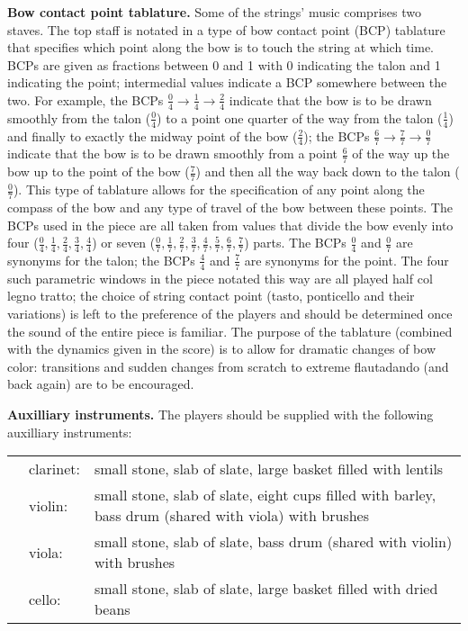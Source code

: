 \documentclass[10pt]{article}
\begin{document}
\begin{textblock}{23}
\textbf{Bow contact point tablature.} Some of the strings' music comprises two
staves. The top staff is notated in a type of bow contact point (BCP) tablature
that specifies which point along the bow is to touch the string at which time.
BCPs are given as fractions between 0 and 1 with 0 indicating the talon and 1
indicating the point; intermedial values indicate a BCP somewhere between the
two. For example, the BCPs $\frac{0}{4} \longrightarrow \frac{1}{4}
\longrightarrow \frac{2}{4}$ indicate that the bow is to be drawn smoothly from
the talon ($\frac{0}{4}$) to a point one quarter of the way from the talon
($\frac{1}{4}$) and finally to exactly the midway point of the bow
($\frac{2}{4}$); the BCPs $\frac{6}{7} \longrightarrow \frac{7}{7}
\longrightarrow \frac{0}{7}$ indicate that the bow is to be drawn smoothly from
a point $\frac{6}{7}$ of the way up the bow up to the point of the bow
($\frac{7}{7}$) and then all the way back down to the talon ($\frac{0}{7}$).
This type of tablature allows for the specification of any point along the
compass of the bow and any type of travel of the bow between these points. The
BCPs used in the piece are all taken from values that divide the bow evenly
into four ($\frac{0}{4}, \frac{1}{4}, \frac{2}{4}, \frac{3}{4}, \frac{4}{4}$)
or seven ($\frac{0}{7}, \frac{1}{7}, \frac{2}{7}, \frac{3}{7}, \frac{4}{7},
\frac{5}{7}, \frac{6}{7}, \frac{7}{7}$) parts. The BCPs $\frac{0}{4}$ and
$\frac{0}{7}$ are synonyms for the talon; the BCPs $\frac{4}{4}$ and
$\frac{7}{7}$ are synonyms for the point. The four such parametric windows in
the piece notated this way are all played half col legno tratto; the choice of
string contact point (tasto, ponticello and their variations) is left to the
preference of the players and should be determined once the sound of the entire
piece is familiar. The purpose of the tablature (combined with the dynamics
given in the score) is to allow for dramatic changes of bow color: transitions
and sudden changes from scratch to extreme flautadando (and back again) are to
be encouraged.

\textbf{Auxilliary instruments.} The players should be supplied with the
following auxilliary instruments:

\begin{tabu}{l l l}
\phantom{M} & clarinet: & small stone, slab of slate, large basket filled with lentils \\
            & violin: & small stone, slab of slate, eight cups filled with barley, bass drum (shared with viola) with brushes \\
            & viola: & small stone, slab of slate, bass drum (shared with violin) with brushes \\
            & cello: & small stone, slab of slate, large basket filled with dried beans \\
\end{tabu}


\end{textblock}
\end{document}
